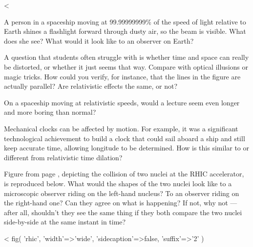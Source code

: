<%

\vfill

\startdqs
\begin{dq}
A person in a spaceship moving at 99.99999999\% of the
speed of light relative to Earth shines a flashlight forward
through dusty air, so the beam is visible. What does she
see? What would it look like to an observer on Earth?
\end{dq}

\vspace{m4_ifelse(__me,1,5,0)mm}

\begin{dq}\label{dq:illusion}
A question that students often struggle with is whether
time and space can really be distorted, or whether it just
seems that way. Compare with optical illusions or magic
tricks. How could you verify, for instance, that the lines
in the figure are actually parallel? Are relativistic
effects the same, or not?
\end{dq}

\vspace{m4_ifelse(__me,1,5,0)mm}

\begin{dq}
On a spaceship moving at relativistic speeds, would a
lecture seem even longer and more boring than normal?
\end{dq}

\vspace{m4_ifelse(__me,1,5,0)mm}

\begin{dq}
Mechanical clocks can be affected by motion. For example,
it was a significant technological achievement to build a
clock that could sail aboard a ship and still keep accurate
time, allowing longitude to be determined. How is this
similar to or different from relativistic time dilation?
\end{dq}

\begin{dq}\label{dq:rhic}
Figure  from page \pageref{fig:rhic}, depicting the collision of
two nuclei at the RHIC accelerator, is reproduced below.
What would the shapes of the two nuclei
look like to a microscopic observer riding on the
left-hand nucleus? To an observer riding on the right-hand
one? Can they agree on what is happening? If not, why not
--- after all, shouldn't they see the same thing if they
both compare the two nuclei side-by-side at the same instant in time?
\end{dq}
<%
  fig(
    'rhic',
    {
      'width'=>'wide',
      'sidecaption'=>false,
      'suffix'=>'2'
    }
  )

